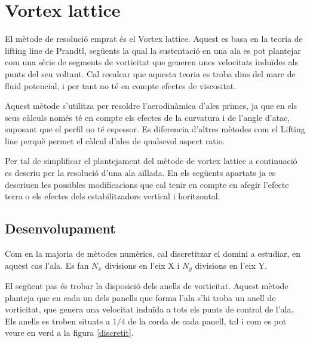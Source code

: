 \chapter{Vortex lattice}

El mètode de resolució emprat és el Vortex lattice. Aquest es basa en la teoria de lifting line de Prandtl, següents la qual la sustentació en una ala es pot plantejar com una sèrie de segments de vorticitat que generen unes velocitats induïdes als punts del seu voltant. Cal recalcar que aquesta teoria es troba dins del marc de fluid potencial, i per tant no té en compte efectes de viscositat.

Aquest mètode s'utilitza per resoldre l'aerodinàmica d'ales primes, ja que en els seus càlculs només té en compte els efectes de la curvatura i de l'angle d'atac, suposant que el perfil no té espessor. Es diferencia d'altres mètodes com el Lifting line perquè permet el càlcul d'ales de qualsevol aspect ratio.

Per tal de simplificar el plantejament del mètode de vortex lattice a continuació es descriu per la resolució d'una ala aïllada. En els següents apartats ja es descriuen les possibles modificacions que cal tenir en compte en afegir l'efecte terra o els efectes dels estabilitzadors vertical i horitzontal.

\section{Desenvolupament}

Com en la majoria de mètodes numèrics, cal discretitzar el domini a estudiar, en aquest cas l'ala. Es fan $N_{x}$ divisions en l'eix X i $N_{y}$ divisions en l'eix Y.

El següent pas és trobar la disposició dels anells de vorticitat. Aquest mètode planteja que en cada un dels panells que forma l'ala s'hi troba un anell de vorticitat, que genera una velocitat induïda a tots els punts de control de l'ala. Els anells es troben situats a $1/4$ de la corda de cada panell, tal i com es pot veure en verd a la figura \ref{discretit}.

